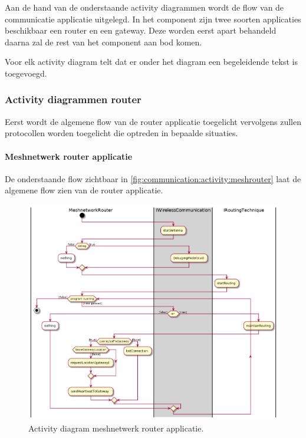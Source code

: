 \documentclass[a4paper, 11pt, oneside]{report}
\begin{document}
Aan de hand van de onderstaande activity diagrammen wordt de flow van de communicatie applicatie uitgelegd. 
In het component zijn twee soorten applicaties beschikbaar een router en een gateway. 
Deze worden eerst apart behandeld daarna zal de rest van het component aan bod komen.

Voor elk activity diagram telt dat er onder het diagram een begeleidende tekst is toegevoegd.

\subsubsection{Activity diagrammen router}
\label{DetailedDesign:Communicatie:Activity:router}

Eerst wordt de algemene flow van de router applicatie toegelicht vervolgens zullen protocollen worden toegelicht die optreden in bepaalde situaties.

\paragraph{Meshnetwerk router applicatie}
\label{DetailedDesign:Communicatie:Activity:router:applicatie}
De onderstaande flow zichtbaar in \autoref{fig:communication:activity:meshrouter} laat de algemene flow zien van de router applicatie. 


\begin{figure}[H]
	\begin{center}\includegraphics[width=.83\linewidth]{UML/out/Communication/activity/MeshRouter/MeshRouter.png}\end{center}
	\caption{Activity diagram meshnetwerk router applicatie.}
	\label{fig:communication:activity:meshrouter}
\end{figure}
\end{document}
